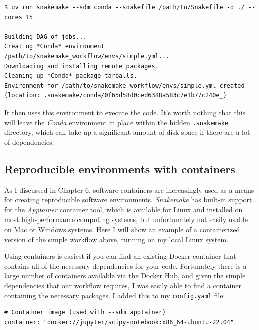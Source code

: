 \begin{lstlisting}[style=shell]
$ uv run snakemake --sdm conda --snakefile /path/to/Snakefile -d ./ --cores 15

Building DAG of jobs...
Creating *Conda* environment /path/to/snakemake_workflow/envs/simple.yml...
Downloading and installing remote packages.
Cleaning up *Conda* package tarballs.
Environment for /path/to/snakemake_workflow/envs/simple.yml created (location: .snakemake/conda/0f65d58d0ced6388a583c7e1b77c240e_)
\end{lstlisting}

It then uses this environment to execute the code.  It's worth nothing that this will leave the \textit{Conda} environment in place within the hidden \texttt{.snakemake} directory, which can take up a significant amount of disk space if there are a lot of dependencies.

\subsection{Reproducible environments with containers}

As I discussed in Chapter 6, software containers are increasingly used as a means for creating reproducible software environments. \textit{Snakemake} has built-in support for the \textit{Apptainer} container tool, which is available for Linux and installed on most high-performance computing systems, but unfortunately not easily usable on Mac or Windows systems. Here I will show an example of a containerized version of the simple workflow above, running on my local Linux system.

Using containers is easiest if you can find an existing Docker container that contains all of the necessary dependencies for your code.  Fortunately there is a large number of containers available via the \href{https://hub.docker.com/}{Docker Hub}, and given the simple dependencies that our workflow requires, I was easily able to find \href{https://hub.docker.com/layers/jupyter/scipy-notebook/x86\_64-ubuntu-22.04/images/sha256-3b37958b7b31ce94c3027d7c83c98fc16acfe166fab2de2f62ae54c50e59aed3}{a container} containing the necessary packages.  I added this to my \texttt{config.yaml} file:

\begin{lstlisting}[style=yaml]
# Container image (used with --sdm apptainer)
container: "docker://jupyter/scipy-notebook:x86_64-ubuntu-22.04"
\end{lstlisting}

